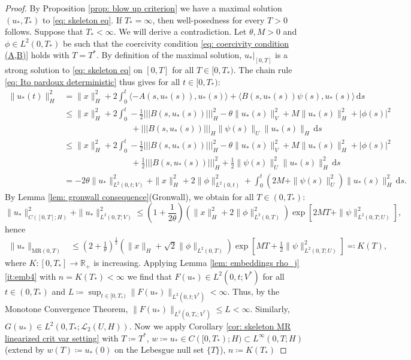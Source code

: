 \documentclass{amsart}
\newcommand{\dd}{\,\mathrm{d}}
\renewcommand{\MR}{\mathrm{MR}}
\newcommand{\UH}{\mathcal{L}_2(U,H)}
\newcommand{\<}{\langle}
\newcommand{\?}{\rangle}
\newcommand{\nn}{|\!|\!|}
\theoremstyle{plain}
\theoremstyle{remark}
\theoremstyle{plain}
\numberwithin{equation}{section}
\def\R{{\mathbb R}}
\begin{document}
\begin{proof}
By Proposition \ref{prop: blow up criterion} we have a maximal solution $(u_*,T_*)$ to  \eqref{eq: skeleton eq}. If $T_*=\infty$, then well-posedness for every $T>0$ follows.
Suppose that $T_*<\infty$. We will derive a contradiction.
Let $\theta, M>0$ and $\phi\in L^2(0,T_*)$ be such that the coercivity condition \eqref{eq: coercivity condition (A,B)} holds with $T=T^*$. By definition of the maximal solution, $u_*|_{[0,T]}$ is a strong solution to  \eqref{eq: skeleton eq} on $[0,T]$ for all $T\in[0,T_*)$.
The chain rule \eqref{eq: Ito pardoux deterministic} thus gives for all $t\in [0,T_*)$:
 \begin{align*}
   \|u_*(t)\|_H^2&=\|x\|_H^2+2\int_0^t \<-A(s,u_*(s)),u_*(s)\?+\<B(s,u_*(s))\psi(s),u_*(s)\? \dd s \\
    &\leq \|x\|_H^2+2\int_0^t -\frac{1}{2}\nn B(s,u_*(s))\nn_H^2 -\theta\|u_*(s)\|_V^2+M\|u_*(s)\|_H^2+|\phi(s)|^2 \\
    &\qquad\qquad\qquad\qquad+\nn B(s,u_*(s))\nn_H\|\psi(s)\|_U\|u_*(s)\|_H \dd s \\
    &\leq \|x\|_H^2+2\int_0^t -\frac{1}{2}\nn B(s,u_*(s))\nn_H^2 -\theta\|u_*(s)\|_V^2+M\|u_*(s)\|_H^2+|\phi(s)|^2  \\
    &\qquad\qquad\qquad\qquad+\frac{1}{2}\nn B(s,u_*(s))\nn_H^2+\frac{1}{2}\|\psi(s)\|_U^2\|u_*(s)\|_H^2 \dd s  \\
    &=-2\theta\|u_*\|_{L^2(0,t;V)}^2+\|x\|_H^2+2\|\phi\|_{L^2(0,t)}^2+\int_0^t (2M+\|\psi(s)\|_U^2)\|u_*(s)\|_H^2\dd s.
  \end{align*}
  By Lemma \ref{lem: gronwall consequence}(Gronwall), we obtain for all $T\in(0,T_*)$:
  \[
  \|u_*\|_{C([0,T];H)}^2+\|u_*\|_{L^2(0,T;V)}^2\leq (1+\frac{1}{2\theta})\left(\|x\|_H^2+2\|\phi\|_{L^2(0,T)}^2\right)\exp[2MT+\|\psi\|_{L^2(0,T;U)}^2],
  \]
  hence
  \begin{align}\label{eq: MR estimate global sol prep}
  \|u_*\|_{\MR(0,T)} &\leq (2+\frac{1}{\theta})^{\frac{1}{2}}\left(\|x\|_H+\sqrt{2}\|\phi\|_{L^2(0,T)} \right)\exp[ MT+\frac{1}{2}\|\psi\|_{L^2(0,T;U)}^2]\eqqcolon K(T),
  \end{align}
  where $K\colon [0,T_*]\to \R_+$ is increasing.
Applying Lemma \ref{lem: embeddings rho_j}\ref{it:emb4}
  with $n=K(T_*)<\infty$ we find that $F(u_*)\in L^2(0,t;V^*)$ for all $t\in (0,T_*)$ and $L\coloneqq \sup_{t\in[0,T_*)}\|F(u_*)\|_{L^2(0,t;V^*)}<\infty$.
  Thus, by the Monotone Convergence Theorem, $\|F(u_*)\|_{L^2(0,T_*;V^*)}\leq L<\infty$.
  Similarly, $G(u_*)\in L^2(0,T_*;\UH)$.
 Now we apply Corollary \ref{cor: skeleton MR linearized crit var setting} with $T\coloneqq T^*$, $w\coloneqq u_*\in C([0,T_*);H)\subset L^\infty(0,T;H)$ (extend by $w(T)\coloneqq u_*(0)$ on the Lebesgue null set $\{T\}$), $n\coloneqq K(T_*)$

\end{proof}
\end{document}
